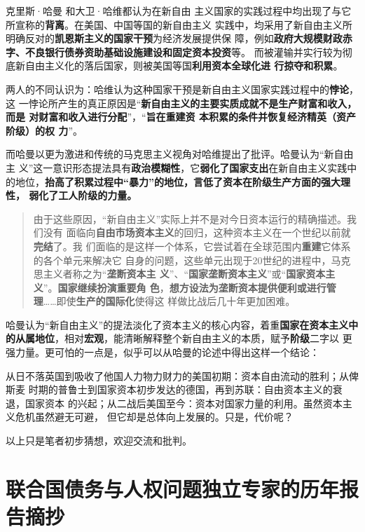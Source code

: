 克里斯·哈曼\cite{chrisharmanneo1} \cite{chrisharmanneo2}和大卫·哈维都认为在新自由
主义国家的实践过程中均出现了与它所宣称的\textbf{背离}。在美国、中国等国的新自由主义
实践中，均采用了新自由主义所明确反对的\textbf{凯恩斯主义的国家干预}为经济发展提供保
障，例如\textbf{政府大规模财政赤字、不良银行债券资助基础设施建设和固定资本投资}等。
而被灌输并实行较为彻底新自由主义化的落后国家，则被美国等国\textbf{利用资本全球化进
  行掠夺和积累}。

两人的不同认识为：哈维认为这种国家干预是新自由主义国家实践过程中的\textbf{悖论}，这
一悖论所产生的真正原因是“\textbf{新自由主义的主要实质成就不是生产财富和收入，而是
  对财富和收入进行分配}”，“\textbf{旨在重建资
  本积累的条件并恢复经济精英（资产阶级）的权
  力}”。

而哈曼以更为激进和传统的马克思主义视角对哈维提出了批评。哈曼认为“新自由主
义”这一意识形态提法具有\textbf{政治模糊性}，它\textbf{弱化了国家支出}在新自由主义实践中
的地位，\textbf{抬高了积累过程中“暴力”的地位，言低了资本在阶级生产方面的强大理性，
  弱化了工人阶级的力量。}
\begin{quotation}
  由于这些原因，“新自由主义”实际上并不是对今日资本运行的精确描述。我们没有
  面临向\textbf{自由市场资本主义}的回归，这种资本主义在一个世纪以前就\textbf{完结}了。我
  们面临的是这样一个体系，它尝试着在全球范围内\textbf{重建}它体系的各个单元来解决它
  自身的问题，这些单元出现于20世纪的进程中，马克思主义者称之为“\textbf{垄断资本主
    义}”、“\textbf{国家垄断资本主义}”或“\textbf{国家资本主义}”。\textbf{国家继续扮演重要角
    色}，\textbf{想方设法为垄断资本提供便利或进行管理}……即使\textbf{生产的国际化}使得这
  样做比战后几十年更加困难。
\end{quotation}

哈曼认为“新自由主义”的提法淡化了资本主义的核心内容，着重\textbf{国家在资本主义中
  的从属地位}，相对\textbf{宏观}，能清晰解释整个新自由主义的本质，赋予\textbf{阶级}二字以
更强力量。更可怕的一点是，似乎可以从哈曼的论述中得出这样一个结论：

从日不落英国到吸收了他国人力物力财力的美国初期：资本自由流动的胜利；从俾斯麦
时期的普鲁士到国家资本初步发达的德国，再到苏联：自由资本主义的衰退，国家资本
的兴起；从二战后美国至今：资本对国家力量的利用。虽然资本主义危机虽然避无可避，
但它却是总体向上发展的。只是，代价呢？

以上只是笔者初步猜想，欢迎交流和批判。



\section{联合国债务与人权问题独立专家的历年报告摘抄}

